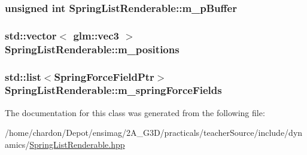 \hypertarget{classSpringListRenderable_af7d75796cec2e6642f04cbe419d2b65b}{
\subsubsection[{m\+\_\+p\+Buffer}]{\setlength{\rightskip}{0pt plus 5cm}unsigned int Spring\+List\+Renderable\+::m\+\_\+p\+Buffer\hspace{0.3cm}{\ttfamily [private]}}}\label{classSpringListRenderable_af7d75796cec2e6642f04cbe419d2b65b}
\hypertarget{classSpringListRenderable_ad6c28805d7de299edb36f01e0b06208c}{
\subsubsection[{m\+\_\+positions}]{\setlength{\rightskip}{0pt plus 5cm}std\+::vector$<$ glm\+::vec3 $>$ Spring\+List\+Renderable\+::m\+\_\+positions\hspace{0.3cm}{\ttfamily [private]}}}\label{classSpringListRenderable_ad6c28805d7de299edb36f01e0b06208c}
\hypertarget{classSpringListRenderable_a82f97da2e2faf5652fcac1e3cd31a60e}{
\subsubsection[{m\+\_\+spring\+Force\+Fields}]{\setlength{\rightskip}{0pt plus 5cm}std\+::list$<${\bf Spring\+Force\+Field\+Ptr}$>$ Spring\+List\+Renderable\+::m\+\_\+spring\+Force\+Fields\hspace{0.3cm}{\ttfamily [private]}}}\label{classSpringListRenderable_a82f97da2e2faf5652fcac1e3cd31a60e}


The documentation for this class was generated from the following file\+:\begin{DoxyCompactItemize}
\item 
/home/chardon/\+Depot/ensimag/2\+A\+\_\+\+G3\+D/practicals/teacher\+Source/include/dynamics/\hyperlink{SpringListRenderable_8hpp}{Spring\+List\+Renderable.\+hpp}\end{DoxyCompactItemize}
